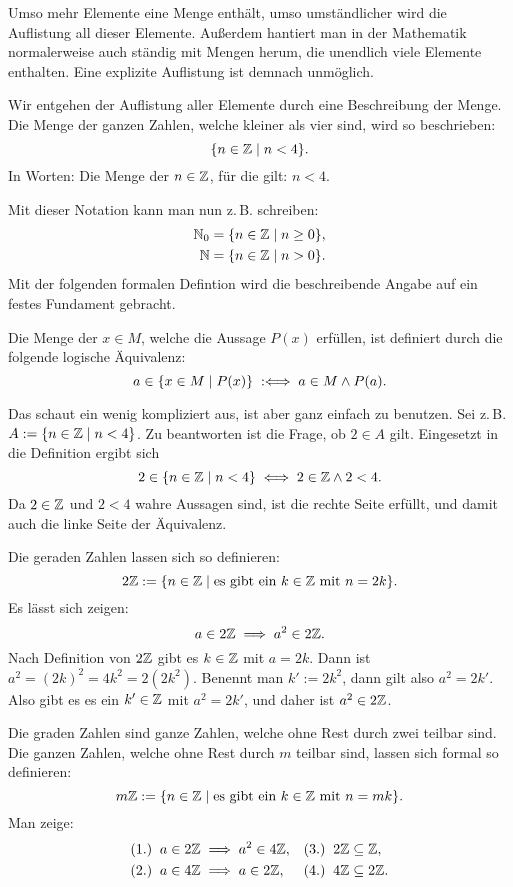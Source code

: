 Umso mehr Elemente eine Menge enthält, umso umständlicher wird
die Auflistung all dieser Elemente. Außerdem hantiert man in der
Mathematik normalerweise auch ständig mit Mengen herum, die
unendlich viele Elemente enthalten. Eine explizite Auflistung ist
demnach unmöglich.

Wir entgehen der Auflistung aller Elemente durch eine Beschreibung
der Menge. Die Menge der ganzen Zahlen, welche kleiner als vier sind,
wird so beschrieben:
\[\{n\in\mathbb Z\mid n<4\}.\]
In Worten: Die Menge der $n\in\mathbb Z$, für die gilt: $n<4$.

Mit dieser Notation kann man nun z.\,B. schreiben:
\begin{align*}
\mathbb N_0 &= \{n\in\mathbb Z\mid n\ge 0\},\\
\mathbb N &= \{n\in\mathbb Z\mid n>0\}.
\end{align*}
Mit der folgenden formalen Defintion wird die beschreibende Angabe
auf ein festes Fundament gebracht.

\begin{Definition}%
\label{def:set-builder-bounded}
Die Menge der $x\in M$, welche die Aussage $P(x)$ erfüllen,
ist definiert durch die folgende logische Äquivalenz:
\[a\in\{x\in M\mid P(x)\} \;:\Longleftrightarrow\; a\in M\land P(a).\]
\end{Definition}
Das schaut ein wenig kompliziert aus, ist aber ganz einfach zu
benutzen. Sei z.\,B. $A:=\{n\in\mathbb Z\mid n<4\}$. Zu beantworten ist
die Frage, ob $2\in A$ gilt. Eingesetzt in die Definition
ergibt sich
\[2\in\{n\in\mathbb Z\mid n<4\}\iff 2\in\mathbb Z\land 2<4.\]
Da $2\in\mathbb Z$ und $2<4$ wahre Aussagen sind, ist die rechte Seite
erfüllt, und damit auch die linke Seite der Äquivalenz.

Die geraden Zahlen lassen sich so definieren:
\[2\mathbb Z:=\{n\in\mathbb Z\mid\text{es gibt ein $k\in\mathbb Z$ mit $n=2k$}\}.\]
Es lässt sich zeigen:
\[a\in 2\mathbb Z\implies a^2\in 2\mathbb Z.\]
Nach Definition von $2\mathbb Z$ gibt es $k\in\mathbb Z$ mit $a=2k$.
Dann ist $a^2=(2k)^2=4k^2=2(2k^2)$. Benennt man $k':=2k^2$, dann
gilt also $a^2=2k'$. Also gibt es es ein $k'\in\mathbb Z$
mit $a^2=2k'$, und daher ist $a^2\in 2\mathbb Z$.

Die graden Zahlen sind ganze Zahlen, welche ohne Rest durch zwei teilbar
sind. Die ganzen Zahlen, welche ohne Rest durch $m$ teilbar sind,
lassen sich formal so definieren:
\[m\mathbb Z:=\{n\in\mathbb Z\mid\text{es gibt ein $k\in\mathbb Z$ mit $n=mk$}\}.\]
Man zeige:
\begin{align*}
& (1.)\;\;a\in 2\mathbb Z\implies a^2\in 4\mathbb Z, && (3.)\;\;2\mathbb Z\subseteq\mathbb Z,\\
& (2.)\;\;a\in 4\mathbb Z\implies a\in 2\mathbb Z,   && (4.)\;\;4\mathbb Z\subseteq 2\mathbb Z.
\end{align*}


